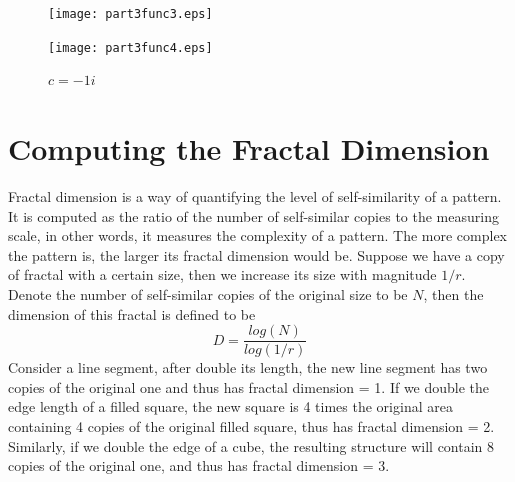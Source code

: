 \documentclass{article}
\begin{document}
   \begin{figure}[H]
  \centering
  \begin{minipage}[b]{0.45\textwidth}
    \texttt{[image: part3func3.eps]}
    \caption{$c = -0.123 - 0.745i$}
  \end{minipage}
  \hfill
  \begin{minipage}[b]{0.45\textwidth}
    \texttt{[image: part3func4.eps]}
    \caption{$c = -1i$}
  \end{minipage}
   \end{figure}
   
\section{Computing the Fractal Dimension}
Fractal dimension is a way of quantifying the level of self-similarity of a pattern. It is computed as the ratio of the number of self-similar copies to the measuring scale, in other words, it measures the complexity of a pattern. The more complex the pattern is, the larger its fractal dimension would be. Suppose we have a copy of fractal with a certain size, then we increase its size with magnitude $1/r$. Denote the number of self-similar copies of the original size to be $N$, then the dimension of this fractal is defined to be $$D = \frac{log(N)}{log(1/r)}$$
Consider a line segment, after double its length, the new line segment has two copies of the original one and thus has fractal dimension = 1.  If we double the edge length of a filled square, the new square is 4 times the original area containing 4 copies of the original filled square, thus has fractal dimension = 2.  Similarly, if we double the edge of a cube, the resulting structure will contain 8 copies of the original one, and thus has fractal dimension = 3. 
\end{document}
